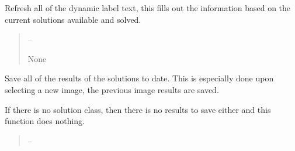 \documentclass[letterpaper,11pt,english]{sphinxmanual}
\begin{document}
\begin{savenotes}
\begin{fulllineitems}
\begin{savenotes}
\begin{fulllineitems}
\begin{quote}
\begin{description}
\end{description}\end{quote}

\end{fulllineitems}\end{savenotes}


\begin{savenotes}\begin{fulllineitems}
\label{\detokenize{code/opihiexarata.gui.manual:opihiexarata.gui.manual.OpihiManualWindow.refresh_dynamic_label_text}}
\pysigstartsignatures
{}
\pysigstopsignatures
\sphinxAtStartPar
Refresh all of the dynamic label text, this fills out the
information based on the current solutions available and solved.
\begin{quote}\begin{description}
\sphinxAtStartPar
{} – 

\sphinxAtStartPar
None

\end{description}\end{quote}

\end{fulllineitems}\end{savenotes}


\begin{savenotes}\begin{fulllineitems}
\label{\detokenize{code/opihiexarata.gui.manual:opihiexarata.gui.manual.OpihiManualWindow.save_results}}
\pysigstartsignatures
{}
\pysigstopsignatures
\sphinxAtStartPar
Save all of the results of the solutions to date. This is especially
done upon selecting a new image, the previous image results are
saved.

\sphinxAtStartPar
If there is no solution class, then there is no results to save either
and this function does nothing.
\begin{quote}\begin{description}
\sphinxAtStartPar
{} – 


\end{description}
\end{quote}
\end{fulllineitems}
\end{savenotes}
\end{fulllineitems}
\end{savenotes}
\end{document}
